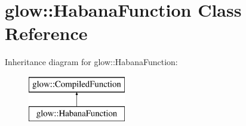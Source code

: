 \hypertarget{classglow_1_1_habana_function}{}\section{glow\+:\+:Habana\+Function Class Reference}
\label{classglow_1_1_habana_function}
Inheritance diagram for glow\+:\+:Habana\+Function\+:\begin{figure}[H]
\begin{center}
\leavevmode
\includegraphics[height=2.000000cm]{classglow_1_1_habana_function}
\end{center}
\end{figure}
